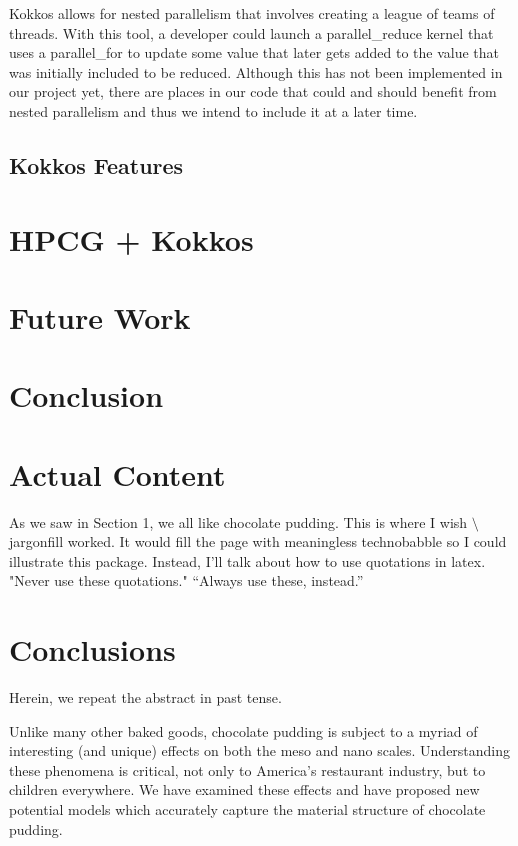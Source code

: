 \documentclass{ccr15}
\begin{document}
Kokkos allows for nested parallelism that involves creating a league of teams of threads.
With this tool, a developer could launch a parallel\_reduce kernel that uses a parallel\_for to
update some value that later gets added to the value that was initially included to be reduced.
Although this has not been implemented in our project yet, there are places in our code that
could and should benefit from nested parallelism and thus we intend to include it at a later
time.

\subsection{Kokkos Features}

\section{HPCG + Kokkos}

\section{Future Work}

\section{Conclusion}

\section{Actual Content}

As we saw in Section 1, we all like chocolate pudding. This is where I wish
\textsf{$\setminus$jargonfill} worked. It would fill the page with meaningless technobabble so I could illustrate this
package. Instead, I'll talk about how to use quotations in latex. "Never use these quotations." ``Always use these,
instead.''

\section{Conclusions}
Herein, we repeat the abstract in past tense.

Unlike many other baked goods, chocolate pudding is subject to a myriad of interesting (and unique) effects on both the
meso and nano scales.  Understanding these phenomena is critical, not only to America's restaurant industry, but to
children everywhere.  We have examined these effects and have proposed new potential models which accurately capture
the material structure of chocolate pudding.


\nocite{ZAB:Mentor05}


%
\end{document}
